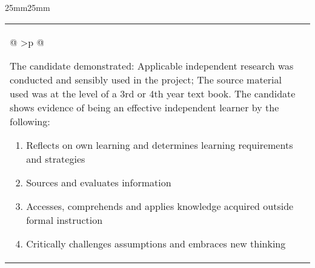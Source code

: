 {\begin{USS@SetMargins}{25mm}{25mm}
\begin{longtable}{@{\extracolsep{\fill}}| >{\raggedright}p{} | >{\raggedright\noindent\arraybackslash}p{32mm} |}
			\nobreakhline
			\multicolumn{2}
			{@{\hspace{\fill}} >{\small\normalfont\justifying}p{\textwidth} @{\hspace{\fill}}}{
			\par The candidate demonstrated: Applicable independent research was conducted and sensibly used in the project; The source material used was at the level of a 3rd or 4th year text book. The candidate shows evidence of being an effective independent learner by the following:
			\begin{enumerate}
				\item Reflects on own learning and determines learning requirements and strategies
				\item Sources and evaluates information
				\item Accesses, comprehends and applies knowledge acquired outside formal instruction
				\item Critically challenges assumptions and embraces new thinking
			\end{enumerate}
			\par}
		\end{longtable}
	\end{USS@SetMargins}
	\clearpage
}
\makeatother


